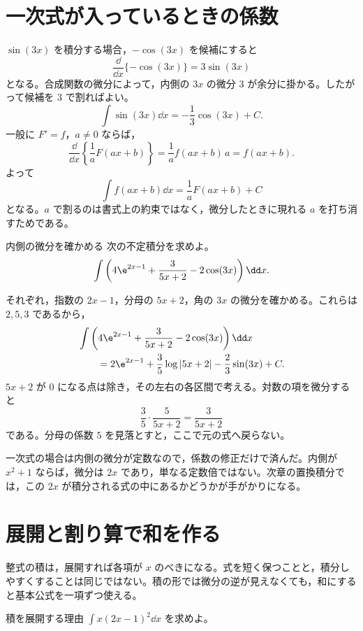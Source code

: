 \section{一次式が入っているときの係数}\label{節:一次式の積分}

$\sin(3x)$ を積分する場合，$-\cos(3x)$ を候補にすると
\[
 \frac{\dd}{\dd x}\{-\cos(3x)\}=3\sin(3x)
\]
となる。合成関数の微分によって，内側の $3x$ の微分 $3$ が余分に掛かる。したがって候補を $3$ で割ればよい。
\[
 \int\sin(3x)\dd x=-\frac13\cos(3x)+C.
\]
一般に $F'=f$，$a\ne0$ ならば，
\[
 \frac{\dd}{\dd x}\left\{\frac1aF(ax+b)\right\}
 =\frac1a f(ax+b)\,a=f(ax+b).
\]
よって
\[
 \int f(ax+b)\dd x=\frac1aF(ax+b)+C
\]
となる。$a$ で割るのは書式上の約束ではなく，微分したときに現れる $a$ を打ち消すためである。

\begin{example}{内側の微分を確かめる}
次の不定積分を求めよ。
\[
 \int\left(4\e^{2x-1}+\frac3{5x+2}-2\cos(3x)\right)\dd x.
\]
\end{example}

それぞれ，指数の $2x-1$，分母の $5x+2$，角の $3x$ の微分を確かめる。これらは $2,5,3$ であるから，
\[
\begin{aligned}
 &\int\left(4\e^{2x-1}+\frac3{5x+2}-2\cos(3x)\right)\dd x\\
 &\qquad=2\e^{2x-1}+\frac35\log|5x+2|
       -\frac23\sin(3x)+C.
\end{aligned}
\]
$5x+2$ が $0$ になる点は除き，その左右の各区間で考える。対数の項を微分すると
\[
 \frac35\cdot\frac5{5x+2}=\frac3{5x+2}
\]
である。分母の係数 $5$ を見落とすと，ここで元の式へ戻らない。

一次式の場合は内側の微分が定数なので，係数の修正だけで済んだ。内側が $x^2+1$ ならば，微分は $2x$ であり，単なる定数倍ではない。次章の置換積分では，この $2x$ が積分される式の中にあるかどうかが手がかりになる。

\section{展開と割り算で和を作る}\label{節:展開と割算}

整式の積は，展開すれば各項が $x$ のべきになる。式を短く保つことと，積分しやすくすることは同じではない。積の形では微分の逆が見えなくても，和にすると基本公式を一項ずつ使える。

\begin{example}{積を展開する理由}
$\int x(2x-1)^2\dd x$ を求めよ。
\end{example}


